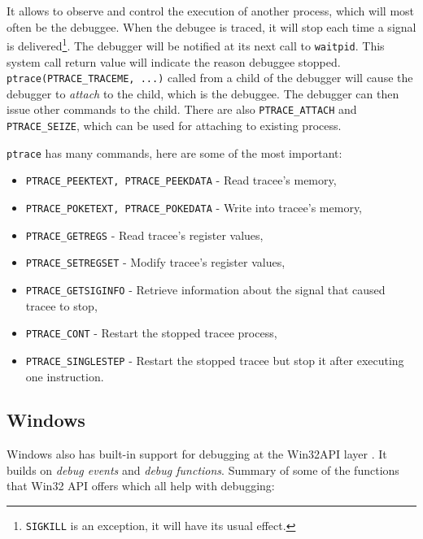 It allows to observe and control the execution of another process, which will most often be the debuggee. When the debugee is traced, it will stop each time a signal is delivered\footnote{\texttt{SIGKILL} is an exception, it will have its usual effect.}. The debugger will be notified at its next call to \texttt{waitpid}. This system call return value will indicate the reason debuggee stopped. \texttt{ptrace(PTRACE_TRACEME, ...)} called from a child of the debugger will cause the debugger to \textit{attach} to the child, which is the debuggee. The debugger can then issue other commands to the child. There are also \texttt{PTRACE_ATTACH} and \texttt{PTRACE_SEIZE}, which can be used for attaching to existing process.

\texttt{ptrace} has many commands, here are some of the most important:
\begin{itemize}
    \item \texttt{PTRACE_PEEKTEXT, PTRACE_PEEKDATA} - Read tracee's memory,
    \item \texttt{PTRACE_POKETEXT, PTRACE_POKEDATA} - Write into tracee's memory,
    \item \texttt{PTRACE_GETREGS} - Read tracee's register values,
    \item \texttt{PTRACE_SETREGSET} - Modify tracee's register values,
    \item \texttt{PTRACE_GETSIGINFO} - Retrieve information about the signal that caused tracee to stop,
    \item \texttt{PTRACE_CONT} - Restart the stopped tracee process,
    \item \texttt{PTRACE_SINGLESTEP} - Restart the stopped tracee but stop it after executing one instruction.
\end{itemize}


\subsection{Windows}
Windows also has built-in support for debugging at the Win32API layer \cite{windows-msdn-debugging-api, windows-press-debugging-api}.
It builds on \textit{debug events} and \textit{debug functions}. Summary of some of the functions that Win32 API offers which all help with debugging:

